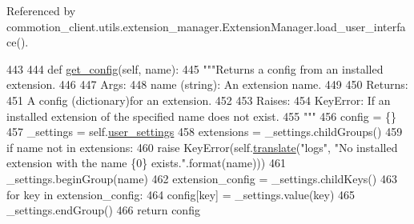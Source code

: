 Referenced by commotion\+\_\+client.\+utils.\+extension\+\_\+manager.\+Extension\+Manager.\+load\+\_\+user\+\_\+interface().


\begin{DoxyCode}
443 
444     \textcolor{keyword}{def }\hyperlink{classcommotion__client_1_1utils_1_1extension__manager_1_1ExtensionManager_a7f811f5c953b4208d9af942c9c173dbf}{get\_config}(self, name):
445         \textcolor{stringliteral}{"""Returns a config from an installed extension.}
446 \textcolor{stringliteral}{                }
447 \textcolor{stringliteral}{        Args:}
448 \textcolor{stringliteral}{          name (string): An extension name.}
449 \textcolor{stringliteral}{        }
450 \textcolor{stringliteral}{        Returns:}
451 \textcolor{stringliteral}{          A config (dictionary)for an extension.}
452 \textcolor{stringliteral}{        }
453 \textcolor{stringliteral}{        Raises:}
454 \textcolor{stringliteral}{          KeyError: If an installed extension of the specified name does not exist.}
455 \textcolor{stringliteral}{        """}
456         config  = \{\}
457         \_settings = self.\hyperlink{classcommotion__client_1_1utils_1_1extension__manager_1_1ExtensionManager_a0fa8b2be1171ded73629a01c50472d34}{user\_settings}
458         extensions  = \_settings.childGroups()
459         \textcolor{keywordflow}{if} name \textcolor{keywordflow}{not} \textcolor{keywordflow}{in} extensions:
460             \textcolor{keywordflow}{raise} KeyError(self.\hyperlink{classcommotion__client_1_1utils_1_1extension__manager_1_1ExtensionManager_a2cfd032ca383c3fd6f0f52b99b6dd67c}{translate}(\textcolor{stringliteral}{"logs"}, \textcolor{stringliteral}{"No installed extension with the name \{0\}
       exists."}.format(name)))
461         \_settings.beginGroup(name)
462         extension\_config = \_settings.childKeys()
463         \textcolor{keywordflow}{for} key \textcolor{keywordflow}{in} extension\_config:
464             config[key] = \_settings.value(key)
465         \_settings.endGroup()
466         \textcolor{keywordflow}{return} config

\end{DoxyCode}
